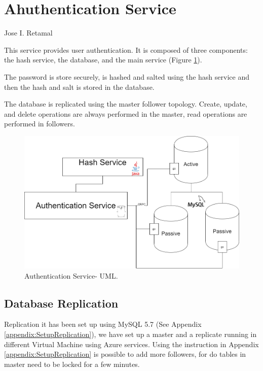 \section{Ahuthentication Service}{Jose I. Retamal }



\indent
\indent
This service provides user authentication. It is composed of three components: the hash service, the database, and the main service (Figure \ref{auth:xxdfdfdfdf}).

The password is store securely, is hashed and salted using the hash service and then the hash and salt is stored in the database.

The database is replicated using the master follower topology. Create, update, and delete operations are always performed in the master, read operations are performed in followers. 

\begin{figure}[H]
\begin{center}
\includegraphics[width=120mm,scale=1]{img/auth/auth-main-uml.png}
\caption{Authentication Service- UML.}
\label{auth:xxdfdfdfdf}
\end{center}

\end{figure}


\subsection{Database Replication}

\indent
\indent
Replication it has been set up using MySQL 5.7 (See Appendix \ref{appendix:SetupReplication}),  we have set up a master and a replicate running in different Virtual Machine using Azure services. Using the instruction in Appendix \ref{appendix:SetupReplication} is possible to add more followers, for do tables in master need to be locked for a few minutes.

